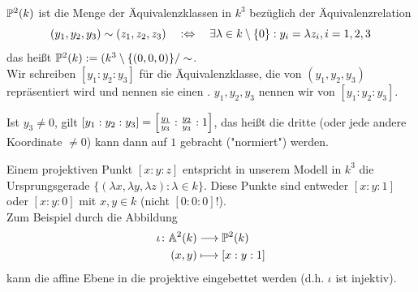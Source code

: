 \begin{defn}
	$\PP^2(k)$ ist die Menge der Äquivalenzklassen in $k^3$ bezüglich der Äquivalenzrelation
	\[ (y_1,y_2,y_3) \sim (z_1,z_2,z_3) \quad :\Leftrightarrow \quad \exists \lambda \in k \setminus \setnull : y_i = \lambda z_i, i = 1, 2, 3 \]
	das heißt $\PP^2(k) := (k^3 \setminus \{(0,0,0)\} / \sim$. \\
	Wir schreiben $[y_1 : y_2 : y_3]$ für die Äquivalenzklasse, die von $(y_1,y_2,y_3)$ repräsentiert wird und nennen sie einen . 
	$y_1,y_2,y_3$ nennen wir  von $[y_1: y_2 : y_3]$.
\end{defn}

\begin{bem}
	Ist $y_3 \neq 0$, gilt $[y_1 : y_2 : y_3] = \benbrace*{\frac{y_1}{y_3} : \frac{y_2}{y_3} : 1}$, das heißt die dritte (oder jede andere Koordinate $\neq 0$) kann dann auf $1$ gebracht ("normiert") werden.
\end{bem}

Einem projektiven Punkt $[x:y:z]$ entspricht in unserem Modell in $k^3$ die Ursprungsgerade $\{(\lambda x, \lambda y, \lambda z) : \lambda \in k\}$. 
Diese Punkte sind entweder $[x:y:1]$ oder $[x:y:0]$ mit $x,y \in k$ (nicht $[0:0:0]$!). \\
Zum Beispiel durch die Abbildung
\begin{equation}
\begin{aligned}
	\iota\colon \aff^2(k) &\longrightarrow \PP^2(k) \\
	(x,y) &\longmapsto [x:y:1]
\end{aligned}
\end{equation}
kann die affine Ebene in die projektive eingebettet werden (d.h. $\iota$ ist injektiv).
\begin{figure}[h]
	\centering
\end{figure}


